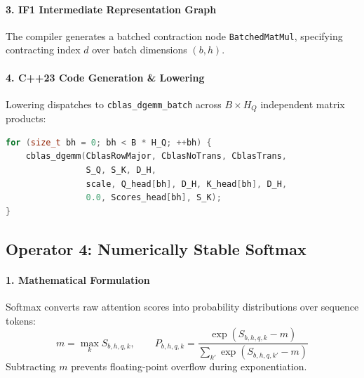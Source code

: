 \paragraph{3. IF1 Intermediate Representation Graph}
The compiler generates a batched contraction node \texttt{BatchedMatMul}, specifying contracting index $d$ over batch dimensions $(b, h)$.

\paragraph{4. C++23 Code Generation \& Lowering}
Lowering dispatches to \texttt{cblas\_dgemm\_batch} across $B \times H_Q$ independent matrix products:
\begin{lstlisting}[language=C++]
for (size_t bh = 0; bh < B * H_Q; ++bh) {
    cblas_dgemm(CblasRowMajor, CblasNoTrans, CblasTrans,
                S_Q, S_K, D_H,
                scale, Q_head[bh], D_H, K_head[bh], D_H,
                0.0, Scores_head[bh], S_K);
}
\end{lstlisting}

\subsection{Operator 4: Numerically Stable Softmax}
\label{subsec:op_softmax}

\paragraph{1. Mathematical Formulation}
Softmax converts raw attention scores into probability distributions over sequence tokens:
\begin{equation}
m = \max_{k} S_{b,h,q,k}, \qquad P_{b,h,q,k} = \frac{\exp(S_{b,h,q,k} - m)}{\sum_{k'} \exp(S_{b,h,q,k'} - m)}
\end{equation}
Subtracting $m$ prevents floating-point overflow during exponentiation.

